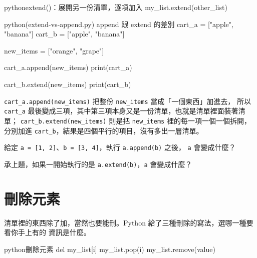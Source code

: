 \begin{code}{python}{extend()：展開另一份清單，逐項加入}
my_list.extend(other_list)
\end{code}

\begin{example}{python}{(extend-vs-append.py) append 跟 extend 的差別}
cart_a = ["apple", "banana"]
cart_b = ["apple", "banana"]

new_items = ["orange", "grape"]

cart_a.append(new_items)
print(cart_a)

cart_b.extend(new_items)
print(cart_b)
\end{example}


\texttt{cart\_a.append(new\_items)} 把整份 \texttt{new\_items} 當成「一個東西」加進去，
所以 \texttt{cart\_a} 最後變成三項，其中第三項本身又是一份清單，也就是清單裡面裝著清單；
\texttt{cart\_b.extend(new\_items)} 則是把 \texttt{new\_items} 裡的每一項一個一個拆開，
分別加進 \texttt{cart\_b}，結果是四個平行的項目，沒有多出一層清單。


\begin{drills}[label=drills:list-extend]
\item 給定 \texttt{a = [1, 2]}、\texttt{b = [3, 4]}，執行 \texttt{a.append(b)} 之後，
\texttt{a} 會變成什麼？
\item 承上題，如果一開始執行的是 \texttt{a.extend(b)}，\texttt{a} 會變成什麼？
\end{drills}

\section{刪除元素}
\label{sec:list-remove}

清單裡的東西除了加，當然也要能刪。Python 給了三種刪除的寫法，選哪一種要看你手上有的
資訊是什麼。

\begin{code}{python}{刪除元素}
del my_list[i]
my_list.pop(i)
my_list.remove(value)
\end{code}

